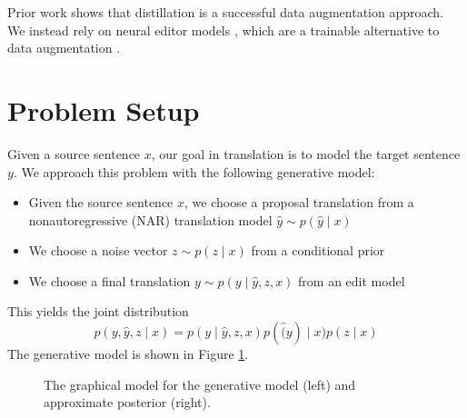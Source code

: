 \documentclass[11pt]{article}
\begin{document}
Prior work shows that distillation is a successful data augmentation approach.
We instead rely on neural editor models \citep{edit},
which are a trainable alternative to data augmentation \citep{recombine}.

\section{Problem Setup}
Given a source sentence $x$, our goal in translation is to model the target sentence $y$.
We approach this problem with the following generative model:
\begin{itemize}
\item Given the source sentence $x$, we choose a proposal translation
    from a nonautoregressive (NAR) translation model  $\hat{y}\sim p(\hat{y} \mid x)$
\item We choose a noise vector $z \sim p(z \mid x)$ from a conditional prior
\item We choose a final translation $y \sim p(y \mid \hat{y}, z, x)$ from an edit model
\end{itemize}
This yields the joint distribution
$$p(y,\hat{y},z \mid x) = p(y \mid \hat{y}, z, x)p(\hat(y) \mid x)p(z \mid x)$$
The generative model is shown in Figure \ref{fig:gen-model}.

\begin{figure}
\centering
\begin{subfigure}{0.48\textwidth}
\centering
{}
\end{subfigure}
\hfill
\begin{subfigure}{0.48\textwidth}
\centering
{}
\end{subfigure}

\caption{
\label{fig:gen-model}
The graphical model for the generative model (left)
and approximate posterior (right).
}
\end{figure}
\end{document}
